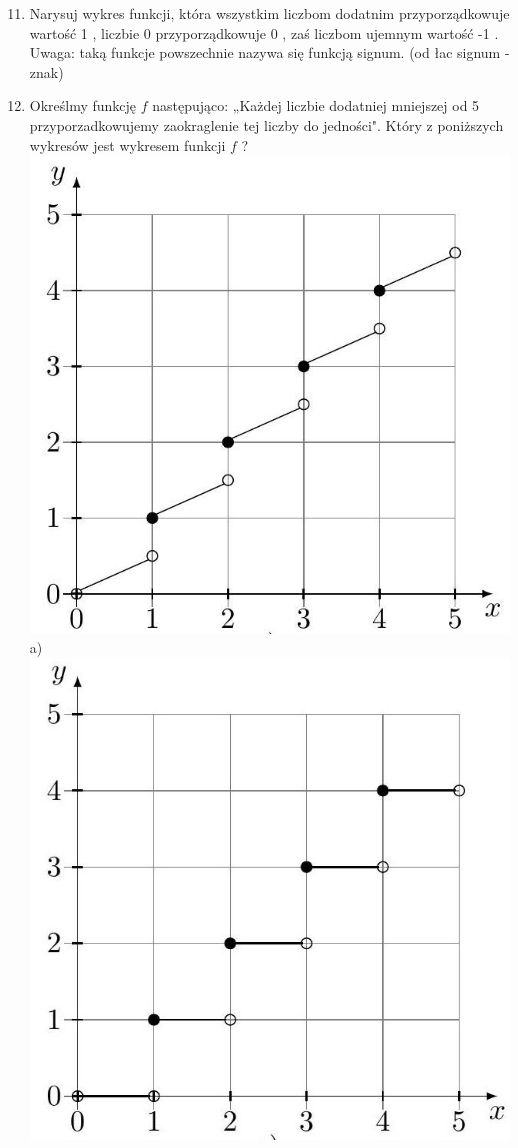 \documentclass[10pt]{article}
\begin{document}
\begin{enumerate}
  \setcounter{enumi}{10}
  \item Narysuj wykres funkcji, która wszystkim liczbom dodatnim przyporządkowuje wartość 1 , liczbie 0 przyporządkowuje 0 , zaś liczbom ujemnym wartość -1 . Uwaga: taką funkcje powszechnie nazywa się funkcją signum. (od łac signum - znak)
  \item Określmy funkcję \(f\) następująco: „Każdej liczbie dodatniej mniejszej od 5 przyporzadkowujemy zaokraglenie tej liczby do jedności". Który z poniższych wykresów jest wykresem funkcji \(f\) ?\\
\includegraphics[max width=\textwidth, center]{2024_11_21_e9b4faa005d5be2cc318g-125(2)}\\
a)\\
\includegraphics[max width=\textwidth, center]{2024_11_21_e9b4faa005d5be2cc318g-125}\\

\end{enumerate}
\end{document}
